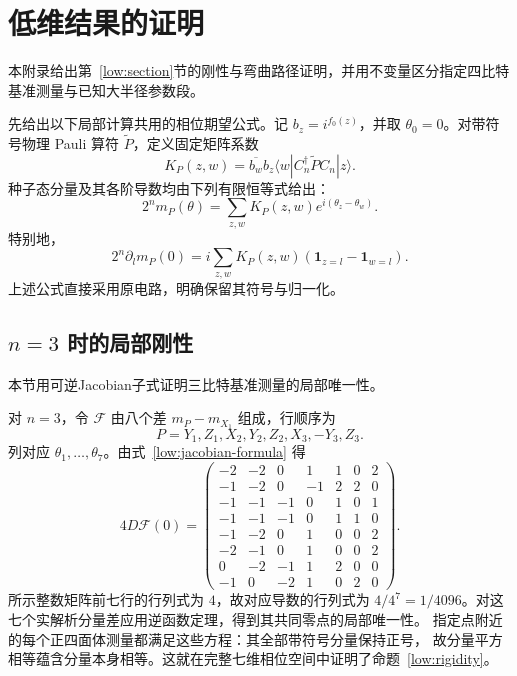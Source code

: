 \section{低维结果的证明}
\label{low:appendix}

本附录给出第~\ref{low:section}节的刚性与弯曲路径证明，并用不变量区分指定四比特基准测量与已知大半径参数段。

先给出以下局部计算共用的相位期望公式。记 $b_z=i^{f_0(z)}$，并取 $\theta_0=0$。对带符号物理 Pauli 算符
$\widetilde P$，定义固定矩阵系数
\begin{equation}
 K_P(z,w)=\overline{b_w}b_z
 \langle w|C_n^\dagger\widetilde P C_n|z\rangle.
 \label{low:finite-coeff}
\end{equation}
种子态分量及其各阶导数均由下列有限恒等式给出：
\begin{equation}
 2^n m_P(\theta)=\sum_{z,w}K_P(z,w)e^{i(\theta_z-\theta_w)}.
 \label{low:finite-sum}
\end{equation}
特别地，
\begin{equation}
 2^n\partial_lm_P(0)
 =i\sum_{z,w}K_P(z,w)
 (\mathbf1_{z=l}-\mathbf1_{w=l}).
 \label{low:jacobian-formula}
\end{equation}
上述公式直接采用原电路，明确保留其符号与归一化。

\subsection{\texorpdfstring{$n=3$}{n=3} 时的局部刚性}
\label{low:app-rigidity}

本节用可逆Jacobian子式证明三比特基准测量的局部唯一性。

对 $n=3$，令 $\mathcal F$ 由八个差 $m_P-m_{X_1}$ 组成，行顺序为
\begin{equation*}
 P=Y_1,Z_1,X_2,Y_2,Z_2,X_3,-Y_3,Z_3.
\end{equation*}
列对应 $\theta_1,\ldots,\theta_7$。由式~\eqref{low:jacobian-formula} 得
\begin{equation}
 4D\mathcal F(0)=
 \begin{pmatrix}
 -2&-2&0&1&1&0&2\\
 -1&-2&0&-1&2&2&0\\
 -1&-1&-1&0&1&0&1\\
 -1&-1&-1&0&1&1&0\\
 -1&-2&0&1&0&0&2\\
 -2&-1&0&1&0&0&2\\
 0&-2&-1&1&2&0&0\\
 -1&0&-2&1&0&2&0
 \end{pmatrix}.
 \label{low:jacobian-three}
\end{equation}
所示整数矩阵前七行的行列式为 $4$，故对应导数的行列式为
$4/4^7=1/4096$。对这七个实解析分量差应用逆函数定理，得到其共同零点的局部唯一性。
指定点附近的每个正四面体测量都满足这些方程：其全部带符号分量保持正号，
故分量平方相等蕴含分量本身相等。这就在完整七维相位空间中证明了命题~\ref{low:rigidity}。


